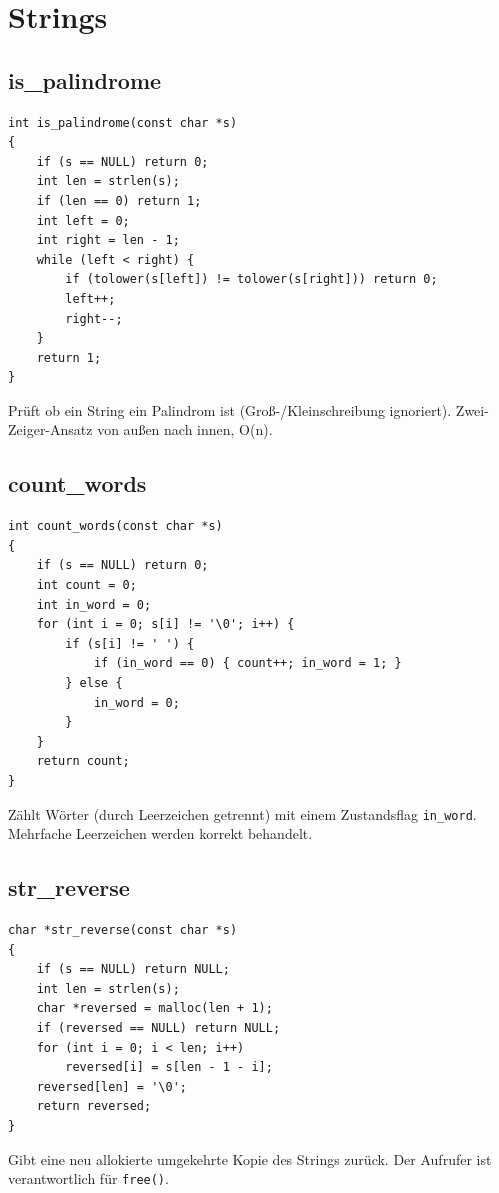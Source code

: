 \documentclass[10pt, a4paper]{article}
\begin{document}
\newpage
\section{Strings}

\subsection{is\_palindrome}
\begin{lstlisting}
int is_palindrome(const char *s)
{
    if (s == NULL) return 0;
    int len = strlen(s);
    if (len == 0) return 1;
    int left = 0;
    int right = len - 1;
    while (left < right) {
        if (tolower(s[left]) != tolower(s[right])) return 0;
        left++;
        right--;
    }
    return 1;
}
\end{lstlisting}
Pr\"uft ob ein String ein Palindrom ist (Gro\ss-/Kleinschreibung ignoriert). Zwei-Zeiger-Ansatz von au\ss en nach innen, O(n).

\subsection{count\_words}
\begin{lstlisting}
int count_words(const char *s)
{
    if (s == NULL) return 0;
    int count = 0;
    int in_word = 0;
    for (int i = 0; s[i] != '\0'; i++) {
        if (s[i] != ' ') {
            if (in_word == 0) { count++; in_word = 1; }
        } else {
            in_word = 0;
        }
    }
    return count;
}
\end{lstlisting}
Z\"ahlt W\"orter (durch Leerzeichen getrennt) mit einem Zustandsflag \texttt{in\_word}. Mehrfache Leerzeichen werden korrekt behandelt.

\subsection{str\_reverse}
\begin{lstlisting}
char *str_reverse(const char *s)
{
    if (s == NULL) return NULL;
    int len = strlen(s);
    char *reversed = malloc(len + 1);
    if (reversed == NULL) return NULL;
    for (int i = 0; i < len; i++)
        reversed[i] = s[len - 1 - i];
    reversed[len] = '\0';
    return reversed;
}
\end{lstlisting}
Gibt eine neu allokierte umgekehrte Kopie des Strings zur\"uck. Der Aufrufer ist verantwortlich f\"ur \texttt{free()}.
\end{document}
